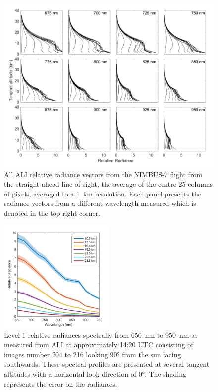 \documentclass[12pt]{article}
\begin{document}
\begin{figure}
\includegraphics[width=1.0\textwidth]{./Images/5-2-AliRadianceVectors.pdf}
    \caption{All ALI relative radiance vectors from the NIMBUS-7 flight from the straight ahead line of sight, the average of the centre 25 columns of pixels, averaged to a 1~km resolution. Each panel presents the radiance vectors from a different wavelength measured which is denoted in the top right corner.}
    \label{fig:AliRadiancesVectors}
\end{figure}

\clearpage

\begin{figure}
\includegraphics[width=0.5\textwidth]{./Images/5-2-AliSpectralRadiances.pdf}
    \caption{Level 1 relative radiances spectrally from 650~nm to 950~nm as measured from ALI at approximately 14:20 UTC consisting of images number 204 to 216 looking 90\si{\degree} from the sun facing southwards. These spectral profiles are presented at several tangent altitudes with a horizontal look direction of 0\si{\degree}. The shading represents the error on the radiances. }
    \label{fig:AliSpectralRadiances}
\end{figure}
\end{document}

